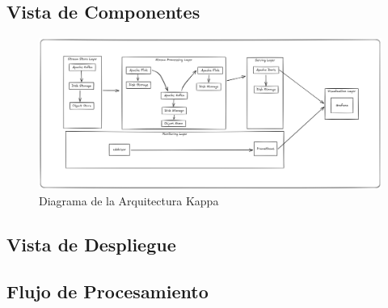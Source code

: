 \subsection{Vista de Componentes}

\begin{figure}[h]
\centering
\includegraphics[width=1\textwidth]{desarrollo/Kappa.png}
\caption{Diagrama de la Arquitectura Kappa}
\label{fig:des_arquitectura_kappa}
\end{figure}

\subsection{Vista de Despliegue}
\subsection{Flujo de Procesamiento}
